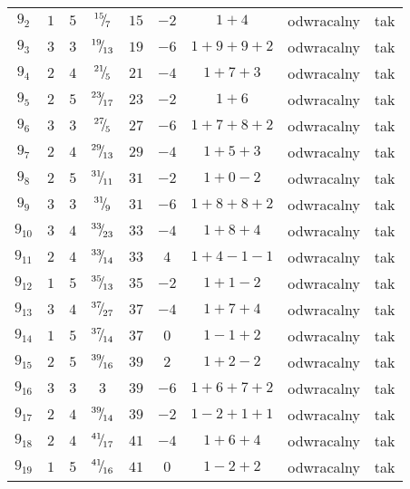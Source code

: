 \begin{longtable}{ccccccccc}
$9_{2}$ & $1$ & $5$ & ${}^{15}{\mskip -5mu/\mskip -3mu}_{7}$ & $15$ & $-2$ & $1+4$ & odwracalny & tak \\
$9_{3}$ & $3$ & $3$ & ${}^{19}{\mskip -5mu/\mskip -3mu}_{13}$ & $19$ & $-6$ & $1+9+9+2$ & odwracalny & tak \\
$9_{4}$ & $2$ & $4$ & ${}^{21}{\mskip -5mu/\mskip -3mu}_{5}$ & $21$ & $-4$ & $1+7+3$ & odwracalny & tak \\
$9_{5}$ & $2$ & $5$ & ${}^{23}{\mskip -5mu/\mskip -3mu}_{17}$ & $23$ & $-2$ & $1+6$ & odwracalny & tak \\
$9_{6}$ & $3$ & $3$ & ${}^{27}{\mskip -5mu/\mskip -3mu}_{5}$ & $27$ & $-6$ & $1+7+8+2$ & odwracalny & tak \\
$9_{7}$ & $2$ & $4$ & ${}^{29}{\mskip -5mu/\mskip -3mu}_{13}$ & $29$ & $-4$ & $1+5+3$ & odwracalny & tak \\
$9_{8}$ & $2$ & $5$ & ${}^{31}{\mskip -5mu/\mskip -3mu}_{11}$ & $31$ & $-2$ & $1+0-2$ & odwracalny & tak \\
$9_{9}$ & $3$ & $3$ & ${}^{31}{\mskip -5mu/\mskip -3mu}_{9}$ & $31$ & $-6$ & $1+8+8+2$ & odwracalny & tak \\
$9_{10}$ & $3$ & $4$ & ${}^{33}{\mskip -5mu/\mskip -3mu}_{23}$ & $33$ & $-4$ & $1+8+4$ & odwracalny & tak \\
$9_{11}$ & $2$ & $4$ & ${}^{33}{\mskip -5mu/\mskip -3mu}_{14}$ & $33$ & $4$ & $1+4-1-1$ & odwracalny & tak \\
$9_{12}$ & $1$ & $5$ & ${}^{35}{\mskip -5mu/\mskip -3mu}_{13}$ & $35$ & $-2$ & $1+1-2$ & odwracalny & tak \\
$9_{13}$ & $3$ & $4$ & ${}^{37}{\mskip -5mu/\mskip -3mu}_{27}$ & $37$ & $-4$ & $1+7+4$ & odwracalny & tak \\
$9_{14}$ & $1$ & $5$ & ${}^{37}{\mskip -5mu/\mskip -3mu}_{14}$ & $37$ & $0$ & $1-1+2$ & odwracalny & tak \\
$9_{15}$ & $2$ & $5$ & ${}^{39}{\mskip -5mu/\mskip -3mu}_{16}$ & $39$ & $2$ & $1+2-2$ & odwracalny & tak \\
$9_{16}$ & $3$ & $3$ & $3$ & $39$ & $-6$ & $1+6+7+2$ & odwracalny & tak \\
$9_{17}$ & $2$ & $4$ & ${}^{39}{\mskip -5mu/\mskip -3mu}_{14}$ & $39$ & $-2$ & $1-2+1+1$ & odwracalny & tak \\
$9_{18}$ & $2$ & $4$ & ${}^{41}{\mskip -5mu/\mskip -3mu}_{17}$ & $41$ & $-4$ & $1+6+4$ & odwracalny & tak \\
$9_{19}$ & $1$ & $5$ & ${}^{41}{\mskip -5mu/\mskip -3mu}_{16}$ & $41$ & $0$ & $1-2+2$ & odwracalny & tak \\

\end{longtable}
